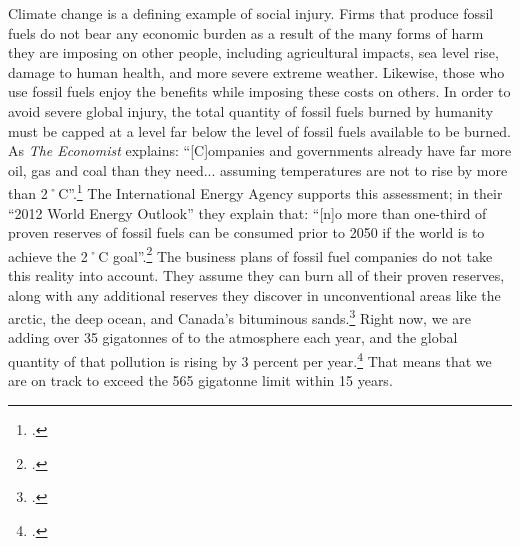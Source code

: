 Climate change is a defining example of social injury.
Firms that produce fossil fuels do not bear any economic burden as a result of the many forms of harm they are imposing on other people, including agricultural impacts, sea level rise, damage to human health, and more severe extreme weather.
Likewise, those who use fossil fuels enjoy the benefits while imposing these costs on others.
In order to avoid severe global injury, the total quantity of fossil fuels burned by humanity must be capped at a level far below the level of fossil fuels available to be burned. 
As \emph{The Economist} explains: ``[C]ompanies and governments already have far more oil, gas and coal than they need... assuming temperatures are not to rise by more than 2˚C''.\footcite[][]{EconomistUnburnable}
The International Energy Agency supports this assessment; in their ``2012 World Energy Outlook'' they explain that: ``[n]o more than one-third of proven reserves of fossil fuels can be consumed prior to 2050 if the world is to achieve the 2˚C goal''.\footcite[][p. 25]{IEA2012}
The business plans of fossil fuel companies do not take this reality into account.
They assume they can burn all of their proven reserves, along with any additional reserves they discover in unconventional areas like the arctic, the deep ocean, and Canada's bituminous sands.\footcite[U.S. Energy Information Administration estimates that there are 345 billion barrels of recoverable shale oil around the world, and 7,299 trillion cubic feet of shale gas: ][]{EIAShaleOilGas}
Right now, we are adding over 35 gigatonnes of  to the atmosphere each year, and the global quantity of that pollution is rising by 3 percent per year.\footcite[][p. 26]{IPCCar4_syr}
That means that we are on track to exceed the 565 gigatonne limit within 15 years.



